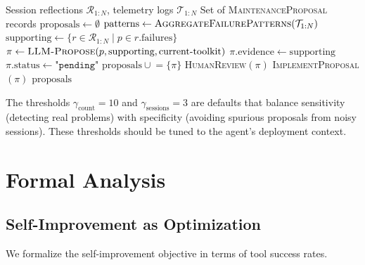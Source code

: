 \documentclass[11pt]{article}
\begin{document}
\begin{algorithm}[H]
\caption{MAINTENANCE-PASS$(\mathcal{R}_{1:N}, \mathcal{T}_{1:N})$}
\label{alg:maintenance}
\begin{algorithmic}[1]
\Require Session reflections $\mathcal{R}_{1:N}$, telemetry logs $\mathcal{T}_{1:N}$
\Ensure Set of \textsc{MaintenanceProposal} records
\State $\text{proposals} \gets \emptyset$
\State $\text{patterns} \gets \textsc{AggregateFailurePatterns}(\mathcal{T}_{1:N})$
        \State $\text{supporting} \gets \{r \in \mathcal{R}_{1:N} \mid p \in r.\text{failures}\}$
        \State $\pi \gets \textsc{LLM-Propose}(p, \text{supporting}, \text{current-toolkit})$
        \State $\pi.\text{evidence} \gets \text{supporting}$
        \State $\pi.\text{status} \gets \texttt{"pending"}$
        \State $\text{proposals} \mathrel{\cup}= \{\pi\}$
    \EndIf
\EndFor
{}
    \State \textsc{HumanReview}$(\pi)$ 
        \State \textsc{ImplementProposal}$(\pi)$
    \EndIf
\EndFor
\State \Return $\text{proposals}$
\end{algorithmic}
\end{algorithm}

The thresholds $\gamma_{\text{count}} = 10$ and $\gamma_{\text{sessions}} = 3$
are defaults that balance sensitivity (detecting real problems) with specificity
(avoiding spurious proposals from noisy sessions). These thresholds should be
tuned to the agent's deployment context.

\section{Formal Analysis}
\label{sec:analysis}

\subsection{Self-Improvement as Optimization}

We formalize the self-improvement objective in terms of tool success rates.
\end{document}
